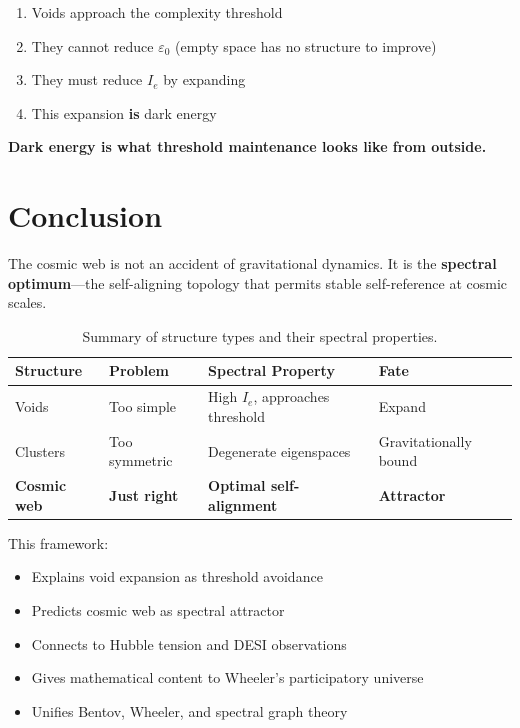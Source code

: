 \documentclass[11pt,a4paper]{article}
\theoremstyle{plain}
\theoremstyle{definition}
\theoremstyle{remark}
\begin{document}
\begin{enumerate}[noitemsep]
    \item Voids approach the complexity threshold
    \item They cannot reduce $\varepsilon_0$ (empty space has no structure to improve)
    \item They must reduce $I_e$ by expanding
    \item This expansion \textbf{is} dark energy
\end{enumerate}

\textbf{Dark energy is what threshold maintenance looks like from outside.}

\section{Conclusion}

The cosmic web is not an accident of gravitational dynamics. It is the \textbf{spectral optimum}---the self-aligning topology that permits stable self-reference at cosmic scales.

\begin{table}[h]
\centering
\begin{tabular}{@{}llll@{}}
\toprule
\textbf{Structure} & \textbf{Problem} & \textbf{Spectral Property} & \textbf{Fate} \\
\midrule
Voids & Too simple & High $I_e$, approaches threshold & Expand \\
Clusters & Too symmetric & Degenerate eigenspaces & Gravitationally bound \\
\textbf{Cosmic web} & \textbf{Just right} & \textbf{Optimal self-alignment} & \textbf{Attractor} \\
\bottomrule
\end{tabular}
\caption{Summary of structure types and their spectral properties.}
\end{table}

This framework:
\begin{itemize}[noitemsep]
    \item Explains void expansion as threshold avoidance
    \item Predicts cosmic web as spectral attractor
    \item Connects to Hubble tension and DESI observations
    \item Gives mathematical content to Wheeler's participatory universe
    \item Unifies Bentov, Wheeler, and spectral graph theory
\end{itemize}
\end{document}
